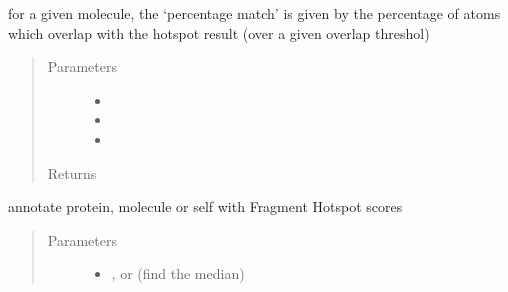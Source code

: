 \documentclass[letterpaper,10pt,english]{sphinxmanual}
\begin{document}
\begin{fulllineitems}
\begin{fulllineitems}
\label{\detokenize{result_api:hotspots.result.Results.percentage_matched_atoms}}
for a given molecule, the ‘percentage match’ is given by the percentage of atoms
which overlap with the hotspot result (over a given overlap threshol)
\begin{quote}\begin{description}
\item[{Parameters}] \leavevmode\begin{itemize}
\item {} 
 \textendash{} 

\item {} 
 \textendash{} 

\item {} 
 \textendash{} 

\end{itemize}

\item[{Returns}] \leavevmode


\end{description}\end{quote}

\end{fulllineitems}


\begin{fulllineitems}
\label{\detokenize{result_api:hotspots.result.Results.score}}
annotate protein, molecule or self with Fragment Hotspot scores
\begin{quote}\begin{description}
\item[{Parameters}] \leavevmode\begin{itemize}
\item {} 
 \textendash{} ,  or  (find the median)


\end{itemize}
\end{description}
\end{quote}
\end{fulllineitems}
\end{fulllineitems}
\end{document}
